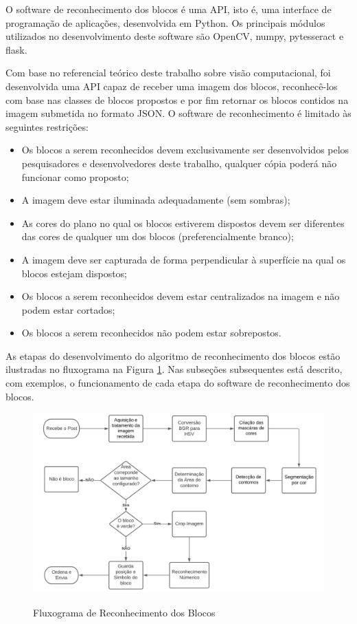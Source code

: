     O software de reconhecimento dos blocos é uma API, isto é, uma interface de programação de aplicações,  desenvolvida em Python. Os principais módulos utilizados no desenvolvimento deste software são OpenCV, numpy, pytesseract e flask.

    Com base no referencial teórico deste trabalho sobre visão computacional, foi desenvolvida uma API capaz de receber uma imagem dos blocos, reconhecê-los com base nas classes de blocos propostos e por fim retornar os blocos contidos na imagem submetida no formato JSON. O software de reconhecimento é limitado às seguintes restrições:
    
        \begin{itemize}
        \item Os blocos a serem reconhecidos devem exclusivamente ser desenvolvidos pelos pesquisadores e desenvolvedores deste trabalho, qualquer cópia poderá não funcionar como proposto;
        \item A imagem deve estar iluminada adequadamente (sem sombras);
        \item As cores do plano no qual os blocos estiverem dispostos devem ser diferentes das cores de qualquer um dos blocos (preferencialmente branco);
        \item A imagem deve ser capturada de forma perpendicular à superfície na qual os blocos estejam dispostos;
       \item Os blocos a serem reconhecidos devem estar centralizados na imagem e não podem estar cortados;
      \item Os blocos a serem reconhecidos não podem estar sobrepostos.
    \end{itemize}

    As etapas do desenvolvimento do algoritmo de reconhecimento dos blocos estão ilustradas no fluxograma na Figura \ref{figura:fluxo}. 
    Nas subseções subsequentes está descrito, com exemplos, o funcionamento de cada etapa do software de reconhecimento dos blocos.
    
    \begin{figure}[H]
        \caption{Fluxograma de Reconhecimento dos Blocos}
        \centering
        \includegraphics[width=\linewidth]{Imagens/Cap4/fluxo.PNG}
        \label{figura:fluxo}
    \end{figure}


